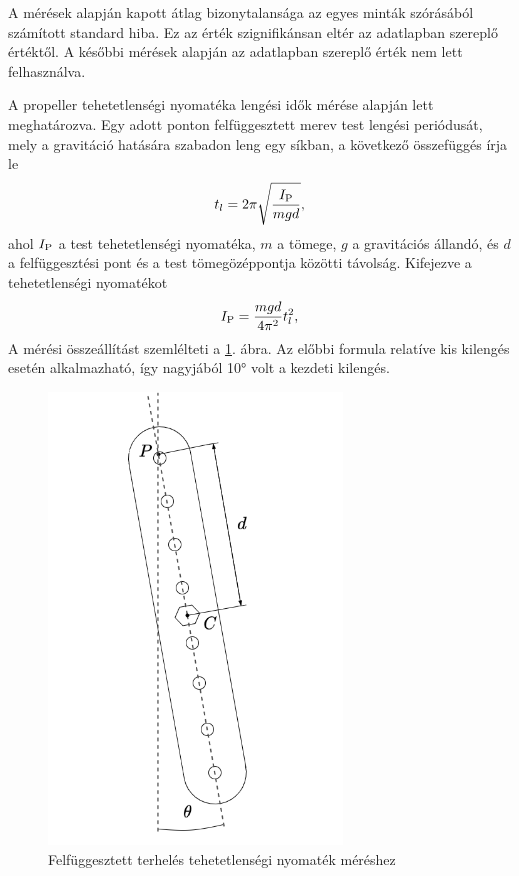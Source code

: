 A mérések alapján kapott átlag bizonytalansága az egyes minták szórásából számított 
standard hiba. Ez az érték szignifikánsan eltér az adatlapban szereplő értéktől. A 
későbbi mérések alapján az adatlapban szereplő érték nem lett felhasználva.

A propeller tehetetlenségi nyomatéka lengési idők mérése alapján lett meghatározva. Egy 
adott ponton felfüggesztett merev test lengési periódusát, mely a gravitáció hatására 
szabadon leng egy síkban, a következő összefüggés írja le
\begin{equation}
    t_l = 2\pi\sqrt{\frac{I_{\mathrm{P}}}{mgd}},
\end{equation}
ahol \(I_{\mathrm{P}}\) a test tehetetlenségi nyomatéka, \(m\) a tömege, \(g\) a gravitációs állandó, 
és \(d\) a felfüggesztési pont és a test tömegözéppontja közötti távolság. 
Kifejezve a tehetetlenségi nyomatékot 
\begin{equation}
    I_{\mathrm{P}} = \frac{mgd}{4\pi^2}t^2_l,
\end{equation}
A mérési összeállítást szemlélteti a \ref{fig:propeller_pendulum}. ábra. Az 
előbbi formula relatíve kis kilengés esetén alkalmazható, így nagyjából 
10° volt a kezdeti kilengés.
\begin{figure}[H]
    \begin{center}
    \includegraphics[height=12cm]{images/impedance_control_propeller.png}
    \caption{Felfüggesztett terhelés tehetetlenségi nyomaték méréshez}\label{fig:propeller_pendulum}
    \end{center}
\end{figure}
